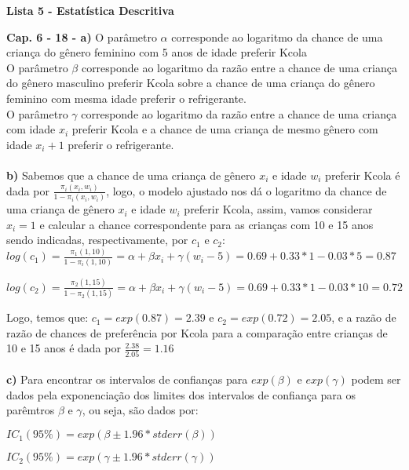 \documentclass[10pt,a4paper]{article}
\begin{document}
\begin{center}
\textbf{Lista 5 - Estatística Descritiva}
\end{center}

\textbf{Cap. 6 - 18 - a)} O parâmetro $\alpha$ corresponde ao logaritmo da chance de uma criança do gênero feminino com 5 anos de idade preferir Kcola \\

O parâmetro $\beta$ corresponde ao logaritmo da razão entre a chance de uma criança do gênero masculino preferir Kcola sobre a chance de uma criança do gênero feminino com mesma idade preferir o refrigerante. \\

O parâmetro $\gamma$ corresponde ao logaritmo da razão entre a chance de uma criança com idade $x_i$ preferir Kcola e a chance de uma criança de mesmo gênero com idade $x_i + 1$ preferir o refrigerante. \\ \\

\textbf{b)} Sabemos que a chance de uma criança de gênero $x_i$ e idade $w_i$ preferir Kcola é dada por $\frac{\pi_i(x_i, w_i)}{1 - \pi_i(x_i, w_i)}$, logo, o modelo ajustado nos dá o logaritmo da chance de uma criança de gênero $x_i$ e idade $w_i$ preferir Kcola, assim, vamos considerar $x_i = 1$ e calcular a chance correspondente para as crianças com 10 e 15 anos sendo indicadas, respectivamente, por $c_1$ e $c_2$: \\

$log(c_1) = \frac{\pi_1(1, 10)}{1 - \pi_i(1, 10)} = \alpha + \beta x_i + \gamma (w_i - 5) = 0.69 + 0.33 * 1 - 0.03 * 5 = 0.87$

$log(c_2) = \frac{\pi_2(1, 15)}{1 - \pi_2(1, 15)} = \alpha + \beta x_i + \gamma (w_i - 5) = 0.69 + 0.33 * 1 - 0.03 * 10 = 0.72$ 

Logo, temos que: $c_1 = exp(0.87) = 2.39$ e $c_2 = exp(0.72) = 2.05$, e a razão de razão de chances de preferência por Kcola para a comparação entre crianças de 10 e 15 anos é dada por $\frac{2.38}{2.05} = 1.16$ \\ \\

\textbf{c)} Para encontrar os intervalos de confianças para $exp(\beta)$ e $exp(\gamma)$ podem ser dados pela exponenciação dos limites dos intervalos de confiança para os parêmtros $\beta$ e $\gamma$, ou seja, são dados por:

\begin{center}
$IC_1(95\%) = exp(\beta \pm 1.96 * stderr (\beta))$

$IC_2(95\%) = exp(\gamma\pm 1.96 * stderr (\gamma))$
\end{center}
\end{document}
